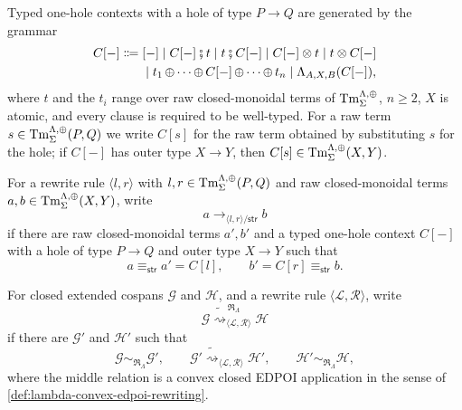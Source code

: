 \begin{definition}
\label{def:lambda-one-hole-context}
Typed one-hole contexts with a hole of type $P\to Q$ are generated by the
grammar
\begin{equation}
\begin{aligned}
  C[-] \Coloneqq{}
  &[-]
  \mid C[-]\fatsemi t
  \mid t\fatsemi C[-]
  \mid C[-]\otimes t
  \mid t\otimes C[-]\\
  &\mid t_1\operatorname{\oplus}\cdots\operatorname{\oplus} C[-]\operatorname{\oplus}\cdots\operatorname{\oplus} t_n
  \mid \Lambda_{A,X,B}(C[-]),
\end{aligned}
\label{eq:typed-one-hole-context}
\end{equation}
where $t$ and the $t_i$ range over raw closed-monoidal terms of
$\operatorname{Tm}^{\Lambda,\operatorname{\oplus}}_{\Sigma}$, $n\geq2$, $X$ is atomic, and
every clause is required to be well-typed. For a raw term
$s\in\operatorname{Tm}^{\Lambda,\operatorname{\oplus}}_{\Sigma}(P,Q)$ we write $C[s]$ for the
raw term obtained by substituting $s$ for the hole; if $C[-]$ has outer
type $X\to Y$, then $C[s]\in\operatorname{Tm}^{\Lambda,\operatorname{\oplus}}_{\Sigma}(X,Y)$.
\end{definition}

\begin{definition}
\label{def:lambda-term-rewriting-modulo}
For a rewrite rule $\langle l, r \rangle$ with
$l,r \in \operatorname{Tm}^{\Lambda, \operatorname{\oplus}}_{\Sigma}(P,Q)$ and raw closed-monoidal terms
$a,b \in \operatorname{Tm}^{\Lambda, \operatorname{\oplus}}_{\Sigma}(X,Y)$, write
\[
 a\longrightarrow_{\langle l, r \rangle/\mathsf{str}}b
\]
if there are raw closed-monoidal terms $a',b'$ and a typed one-hole context $C[-]$ with a
hole of type $P\to Q$ and outer type $X\to Y$ such that
\[
 a\equiv_{\mathsf{str}}a'=C[l],
 \qquad
 b'=C[r]\equiv_{\mathsf{str}}b.
 \tag{\(\dagger\)}
 \label{eq:lambda-term-step-modulo}
\]
\end{definition}


\begin{definition}
\label{def:lambda-edpoi-rewriting-modulo}
For closed extended cospans $\mathcal G$ and $\mathcal H$, and a rewrite rule $\langle \mathcal{L}, \mathcal{R} \rangle$, write
\[
 \mathcal G
 \mathrel{\widetilde{\rightsquigarrow}^{\,\mathfrak R_{\Lambda}}_{\langle \mathcal{L}, \mathcal{R} \rangle}}
 \mathcal H
\]
if there are $\mathcal G'$ and $\mathcal H'$ such that
\[
 \mathcal G\sim_{\mathfrak R_{\Lambda}}\mathcal G',
 \qquad
 \mathcal G'
 \mathrel{\widetilde{\rightsquigarrow}_{\langle \mathcal{L}, \mathcal{R} \rangle}}
 \mathcal H',
 \qquad
 \mathcal H'\sim_{\mathfrak R_{\Lambda}}\mathcal H,
 \tag{\(\ddagger\)}
 \label{eq:lambda-graph-step-modulo}
\]
where the middle relation is a convex closed EDPOI application in the sense of
\cref{def:lambda-convex-edpoi-rewriting}.
\end{definition}

